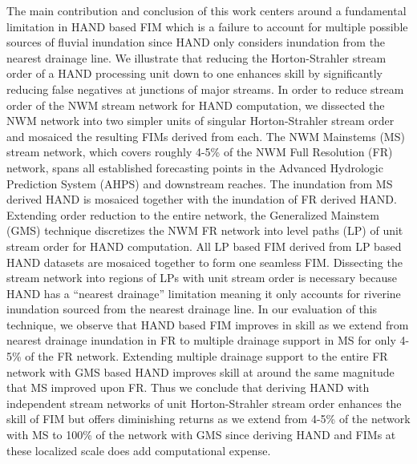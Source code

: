 \documentclass[draft]{dependencies/agujournal2019}
\begin{document}
The main contribution and conclusion of this work centers around a fundamental limitation in HAND based FIM which is a failure to account for multiple possible sources of fluvial inundation since HAND only considers inundation from the nearest drainage line.
We illustrate that reducing the Horton-Strahler stream order of a HAND processing unit down to one enhances skill by significantly reducing false negatives at junctions of major streams.
In order to reduce stream order of the NWM stream network for HAND computation, we dissected the NWM network into two simpler units of singular Horton-Strahler stream order and mosaiced the resulting FIMs derived from each.
The NWM Mainstems (MS) stream network, which covers roughly 4-5\% of the NWM Full Resolution (FR) network, spans all established forecasting points in the Advanced Hydrologic Prediction System (AHPS) and downstream reaches.
The inundation from MS derived HAND is mosaiced together with the inundation of FR derived HAND.
Extending order reduction to the entire network, the Generalized Mainstem (GMS) technique discretizes the NWM FR network into level paths (LP) of unit stream order for HAND computation.
All LP based FIM derived from LP based HAND datasets are mosaiced together to form one seamless FIM.
Dissecting the stream network into regions of LPs with unit stream order is necessary because HAND has a ``nearest drainage'' limitation meaning it only accounts for riverine inundation sourced from the nearest drainage line.
In our evaluation of this technique, we observe that HAND based FIM improves in skill as we extend from nearest drainage inundation in FR to multiple drainage support in MS for only 4-5\% of the FR network.
Extending multiple drainage support to the entire FR network with GMS based HAND improves skill at around the same magnitude that MS improved upon FR.
Thus we conclude that deriving HAND with independent stream networks of unit Horton-Strahler stream order enhances the skill of FIM but offers diminishing returns as we extend from 4-5\% of the network with MS to 100\% of the network with GMS since deriving HAND and FIMs at these localized scale does add computational expense.
\end{document}
